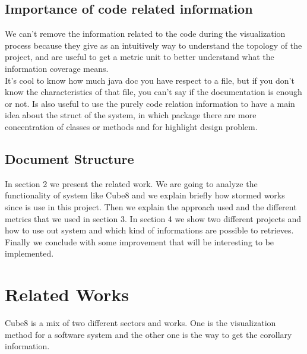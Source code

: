 \documentclass[]{usiinfbachelorproject}
\begin{document}
\subsection{Importance of code related information} 
We can't remove the information related to the code during the visualization process because they give as an intuitively way to understand the topology of the project, and are useful to get a metric unit to better understand what the information coverage means.\\ It's cool to know how much java doc you have respect to a file, but if you don't know the characteristics of that file, you can't say if the documentation is enough or not. Is also useful to use the purely code relation information to have a main idea about the struct of the system, in which package there are more concentration of classes or methods and for highlight design problem.
 

\subsection{Document Structure} 
In section 2 we present the related work. We are going to analyze the functionality of system like Cube8 and we explain briefly how stormed works since is use in this project.
Then we explain the approach used and the different metrics that we used in section 3.
In section 4 we show  two different projects and how to use out system and which kind of informations are possible to retrieves.
Finally we conclude with some improvement that will be interesting  to be implemented.


\newpage


  
\section{Related Works} \label{related works}
Cube8 is a mix of two different sectors and works. One is the visualization method for a software system and the other one is the way to get the corollary information.\\
\end{document}
